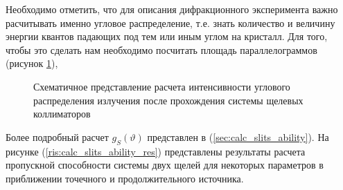  Необходимо отметить, что для описания дифракционного эксперимента важно расчитывать именно
 угловое распределение, т.е. знать количество и величину энергии квантов падающих под тем
 или иным углом на кристалл. Для того, чтобы это сделать нам необходимо посчитать площадь параллелограммов
 (рисунок \ref{ris:how_many_quants_use_parallelogr}),

 \begin{figure}[H]
   \centering
   \hfill
   \caption{Схематичное представление расчета интенсивности углового
   распределения излучения после прохождения системы щелевых коллиматоров}
   \label{ris:how_many_quants_use_parallelogr}
 \end{figure}
Более подробный расчет  $g_S(\vartheta)$ представлен в (\ref{sec:calc_slits_ability}).
На рисунке (\ref{ris:calc_slits_ability_res}) представлены результаты расчета пропускной способности системы двух щелей для некоторых параметров в
приближении точечного и продолжительного источника.

